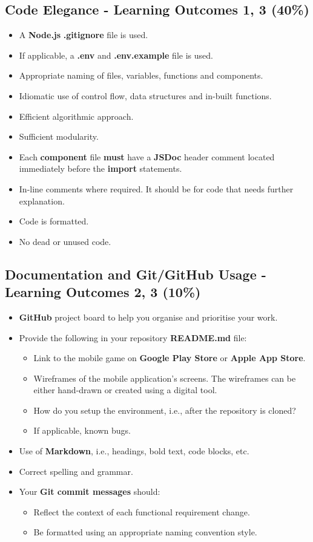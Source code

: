 \documentclass{article}
\begin{document}
\subsection*{Code Elegance - Learning Outcomes 1, 3 (40\%)}
\begin{itemize}
	\item A \textbf{Node.js} \textbf{.gitignore} file is used.
	\item If applicable, a \textbf{.env} and \textbf{.env.example} file is used.
  \item Appropriate naming of files, variables, functions and components.
	\item Idiomatic use of control flow, data structures and in-built functions.
  \item Efficient algorithmic approach.
  \item Sufficient modularity.
  \item Each \textbf{component} file \textbf{must} have a \textbf{JSDoc} header comment located immediately before the \textbf{import} statements.
\item In-line comments where required. It should be for code that needs further explanation.
  \item Code is formatted.
\item No dead or unused code. 
\end{itemize}

\subsection*{Documentation and Git/GitHub Usage - Learning Outcomes 2, 3 (10\%)}
\begin{itemize}
	\item \textbf{GitHub} project board to help you organise and prioritise your work. 
    \item Provide the following in your repository \textbf{README.md} file:
    \begin{itemize} 
	  \item Link to the mobile game on \textbf{Google Play Store} or \textbf{Apple App Store}.
      \item Wireframes of the mobile application's screens. The wireframes can be either hand-drawn or created using a digital tool.
	  \item How do you setup the environment, i.e., after the repository is cloned?
      \item If applicable, known bugs.
    \end{itemize}
    \item Use of \textbf{Markdown}, i.e., headings, bold text, code blocks, etc.
    \item Correct spelling and grammar.
    \item Your \textbf{Git commit messages} should:
    \begin{itemize}
      \item Reflect the context of each functional requirement change.
      \item Be formatted using an appropriate naming convention style.
    \end{itemize}
\end{itemize}
\end{document}
